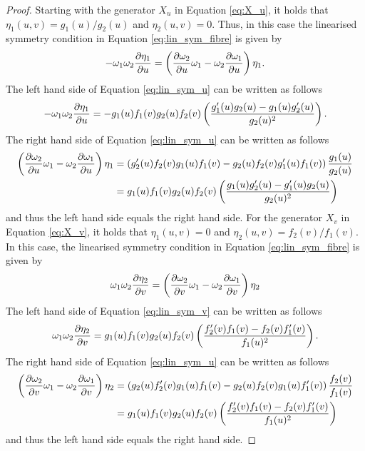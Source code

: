 \begin{proof}
  Starting with the generator $X_u$ in Equation \eqref{eq:X_u}, it holds that $\eta_1(u,v)=g_1(u)/g_2(u)$ and $\eta_2(u,v)=0$. Thus, in this case the linearised symmetry condition in Equation \eqref{eq:lin_sym_fibre} is given by
  \begin{equation}
    -\omega_1\omega_2\pdv{\eta_1}{u}=\left(\pdv{\omega_2}{u}\omega_1-\omega_2\pdv{\omega_1}{u}\right)\eta_1.
    \label{eq:lin_sym_u}
    \end{equation}
    The left hand side of Equation \eqref{eq:lin_sym_u} can be written as follows
    $$-\omega_1\omega_2\pdv{\eta_1}{u}=-g_1(u)f_1(v)g_2(u)f_2(v)\left(\dfrac{g_1'(u)g_2(u)-g_1(u)g_2'(u)}{g_2(u)^2}\right).$$
    The right hand side of Equation \eqref{eq:lin_sym_u} can be written as follows
    \begin{align*}
      \left(\pdv{\omega_2}{u}\omega_1-\omega_2\pdv{\omega_1}{u}\right)\eta_1&=\left(g_2'(u)f_2(v)g_1(u)f_1(v)-g_2(u)f_2(v)g_1'(u)f_1(v)\right)\dfrac{g_1(u)}{g_2(u)}\\
      &=g_1(u)f_1(v)g_2(u)f_2(v)\left(\dfrac{g_1(u)g_2'(u)-g_1'(u)g_2(u)}{g_2(u)^2}\right)
      \end{align*}
      and thus the left hand side equals the right hand side. For the generator $X_v$ in Equation \eqref{eq:X_v}, it holds that $\eta_1(u,v)=0$ and $\eta_2(u,v)=f_2(v)/f_1(v)$. In this case, the linearised symmetry condition in Equation \eqref{eq:lin_sym_fibre} is given by
      \begin{equation}
        \omega_1\omega_2\pdv{\eta_2}{v}=\left(\pdv{\omega_2}{v}\omega_1-\omega_2\pdv{\omega_1}{v}\right)\eta_2
        \label{eq:lin_sym_v}
      \end{equation}
    The left hand side of Equation \eqref{eq:lin_sym_v} can be written as follows
    $$\omega_1\omega_2\pdv{\eta_2}{v}=g_1(u)f_1(v)g_2(u)f_2(v)\left(\dfrac{f_2'(v)f_1(v)-f_2(v)f_1'(v)}{f_1(u)^2}\right).$$
    The right hand side of Equation \eqref{eq:lin_sym_u} can be written as follows
    \begin{align*}
      \left(\pdv{\omega_2}{v}\omega_1-\omega_2\pdv{\omega_1}{v}\right)\eta_2&=\left(g_2(u)f_2'(v)g_1(u)f_1(v)-g_2(u)f_2(v)g_1(u)f_1'(v)\right)\dfrac{f_2(v)}{f_1(v)}\\
      &=g_1(u)f_1(v)g_2(u)f_2(v)\left(\dfrac{f_2'(v)f_1(v)-f_2(v)f_1'(v)}{f_1(u)^2}\right)
    \end{align*}
    and thus the left hand side equals the right hand side.
\end{proof}
\dotfill\\
